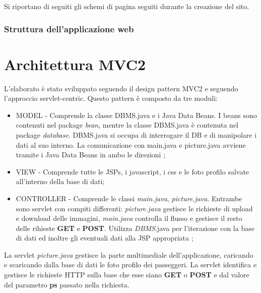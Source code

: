 \documentclass[a4paper,10pt]{article}
\begin{document}
Si riportano di seguiti gli schemi di pagina seguiti durante la creazione del sito.
 
 
 
 
 
 
 
 
\section{Struttura dell'applicazione web}

\part{Architettura MVC2}
L'elaborato \`e stato sviluppato seguendo il design pattern MVC2 e seguendo l'approccio servlet-centric. Questo pattern \`e composto da tre moduli:

\begin{itemize}
 \item MODEL -  Comprende la classe DBMS.java e i Java Data Beans. I beans sono contenuti nel package \textit{bean}, mentre la classe DBMS.java \`e contenuta nel 
		package \textit{database}. DBMS.java si occupa di interrogare il DB e di manipolare i dati al suo interno. 
		La comunicazione con main.java e picture.java  avviene tramite i 
		Java Data Beans in ambo le direzioni ;
 \item VIEW - Comprende tutte le JSPs, i javascript, i css e le foto profilo salvate all'interno della base di dati;
 \item CONTROLLER - Comprende le classi \textit{main.java}, \textit{picture.java}. Entrambe sono servlet con compiti differenti: \textit{picture.java} gestisce le richieste di upload e download delle
		    immagini, \textit{main.java} controlla il flusso e gestisce il resto delle rihieste \textbf{GET} e \textbf{POST}. Utilizza \textit{DBMS}.java per l'iterazione con la base di dati ed inoltre 
		    gli eventuali dati alla JSP appropriata ;
\end{itemize}

La servlet \textit{picture.java} gestisce la parte multimediale dell'applicazione, caricando e scaricando dalla base di dati le foto profilo dei passeggeri.
La servlet identifica e gestisce le richieste HTTP sulla base che esse siano \textbf{GET} o \textbf{POST} e dal valore del parametro \textbf{ps} passato nella richiesta.
\end{document}
